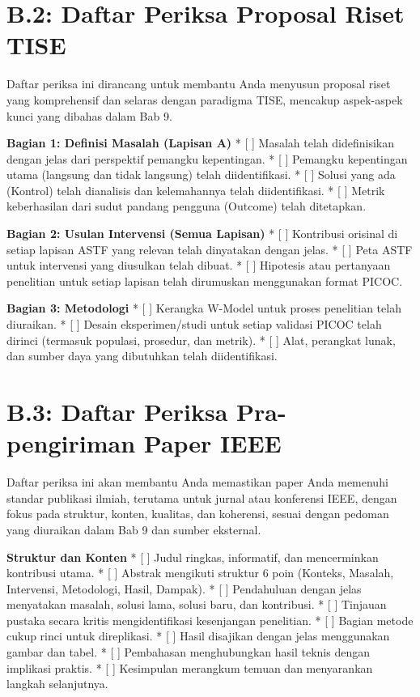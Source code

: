 \documentclass[
  letterpaper,
  DIV=11,
  numbers=noendperiod]{scrreprt}
\begin{document}
\section{\texorpdfstring{\textbf{B.2: Daftar Periksa Proposal Riset
TISE}}{B.2: Daftar Periksa Proposal Riset TISE}}\label{b.2-daftar-periksa-proposal-riset-tise}

Daftar periksa ini dirancang untuk membantu Anda menyusun proposal riset
yang komprehensif dan selaras dengan paradigma TISE, mencakup
aspek-aspek kunci yang dibahas dalam Bab 9.

\textbf{Bagian 1: Definisi Masalah (Lapisan A)} * {[} {]} Masalah telah
didefinisikan dengan jelas dari perspektif pemangku kepentingan. * {[}
{]} Pemangku kepentingan utama (langsung dan tidak langsung) telah
diidentifikasi. * {[} {]} Solusi yang ada (Kontrol) telah dianalisis dan
kelemahannya telah diidentifikasi. * {[} {]} Metrik keberhasilan dari
sudut pandang pengguna (Outcome) telah ditetapkan.

\textbf{Bagian 2: Usulan Intervensi (Semua Lapisan)} * {[} {]}
Kontribusi orisinal di setiap lapisan ASTF yang relevan telah dinyatakan
dengan jelas. * {[} {]} Peta ASTF untuk intervensi yang diusulkan telah
dibuat. * {[} {]} Hipotesis atau pertanyaan penelitian untuk setiap
lapisan telah dirumuskan menggunakan format PICOC.

\textbf{Bagian 3: Metodologi} * {[} {]} Kerangka W-Model untuk proses
penelitian telah diuraikan. * {[} {]} Desain eksperimen/studi untuk
setiap validasi PICOC telah dirinci (termasuk populasi, prosedur, dan
metrik). * {[} {]} Alat, perangkat lunak, dan sumber daya yang
dibutuhkan telah diidentifikasi.

\section{\texorpdfstring{\textbf{B.3: Daftar Periksa Pra-pengiriman
Paper
IEEE}}{B.3: Daftar Periksa Pra-pengiriman Paper IEEE}}\label{b.3-daftar-periksa-pra-pengiriman-paper-ieee}

Daftar periksa ini akan membantu Anda memastikan paper Anda memenuhi
standar publikasi ilmiah, terutama untuk jurnal atau konferensi IEEE,
dengan fokus pada struktur, konten, kualitas, dan koherensi, sesuai
dengan pedoman yang diuraikan dalam Bab 9 dan sumber eksternal.

\textbf{Struktur dan Konten} * {[} {]} Judul ringkas, informatif, dan
mencerminkan kontribusi utama. * {[} {]} Abstrak mengikuti struktur 6
poin (Konteks, Masalah, Intervensi, Metodologi, Hasil, Dampak). * {[}
{]} Pendahuluan dengan jelas menyatakan masalah, solusi lama, solusi
baru, dan kontribusi. * {[} {]} Tinjauan pustaka secara kritis
mengidentifikasi kesenjangan penelitian. * {[} {]} Bagian metode cukup
rinci untuk direplikasi. * {[} {]} Hasil disajikan dengan jelas
menggunakan gambar dan tabel. * {[} {]} Pembahasan menghubungkan hasil
teknis dengan implikasi praktis. * {[} {]} Kesimpulan merangkum temuan
dan menyarankan langkah selanjutnya.
\end{document}
